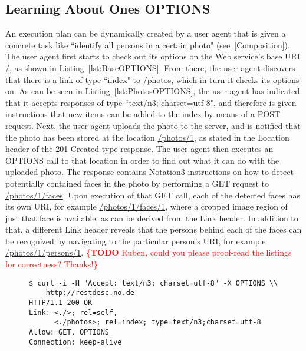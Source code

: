 \documentclass[runningheads,a4paper, twocolumn]{llncs}
\newcommand{\todo}[1]{\noindent\textcolor{red}{{\bf \{TODO} #1{\bf \}}}}
\begin{document}
\subsection{Learning About Ones OPTIONS} \label{MainStory}
An execution plan can be dynamically created by a user agent that is given a concrete task like ``identify all persons in a certain photo" (see~\ref{Composition}). The user agent first starts to check out its options on the Web service's base URI \url{/}, as shown in Listing~\ref{lst:BaseOPTIONS}. From there, the user agent discovers that there is a link of type ``index" to \url{/photos}, which in turn it checks its options on. As can be seen in Listing~\ref{lst:PhotosOPTIONS}, the user agent has indicated that it accepts responses of type ``text/n3; charset=utf-8", and therefore is given instructions that new items can be added to the index by means of a POST request. Next, the user agent uploads the photo to the server, and is notified that the photo has been stored at the location \url{/photos/1}, as stated in the Location header of the 201 Created-type response. The user agent then executes an OPTIONS call to that location in order to find out what it can do with the uploaded photo. The response contains Notation3 instructions on how to detect potentially contained faces in the photo by performing a GET request to \url{/photos/1/faces}.  Upon execution of that GET call, each of the detected faces has its own URI, for example \url{/photos/1/faces/1}, where a cropped image region of just that face is available, as can be derived from the Link header. In addition to that, a different Link header reveals that the persons behind each of the faces can be recognized by navigating to the particular person's URI, for example \url{/photos/1/persons/1}.
\todo{Ruben, could you please proof-read the listings for correctness? Thanks!}
\begin{figure}[float=t!]
\begin{lstlisting}[caption=Listing showing an OPTIONS call on an API's base URI., label=lst:BaseOPTIONS, escapechar=§]
$ curl -i -H "Accept: text/n3; charset=utf-8" -X OPTIONS \\
    http://restdesc.no.de
HTTP/1.1 200 OK
Link: <./>; rel=self,
      <./photos>; rel=index; type=text/n3;charset=utf-8
Allow: GET, OPTIONS      
Connection: keep-alive
\end{lstlisting}
\end{figure}
\end{document}
